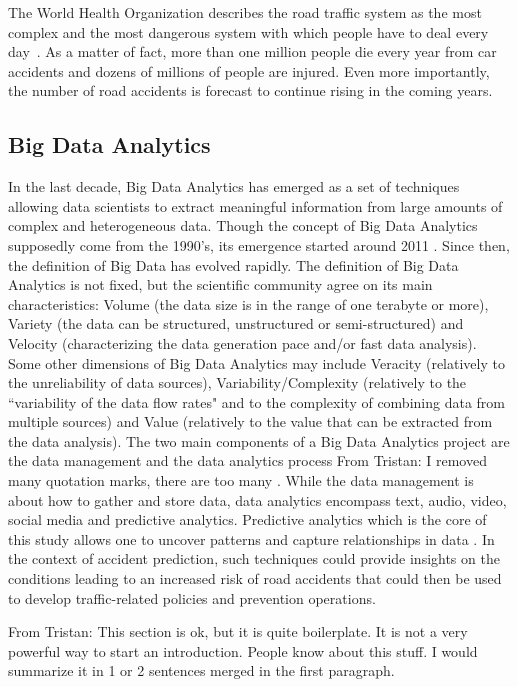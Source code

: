 \documentclass[conference]{IEEEtran}
\newcommand{\TG}[1]{\colorlet{saved}{.}\color{orange}From Tristan: #1\color{saved}}
\begin{document}
The World Health Organization describes the road traffic system as the most
complex and the most dangerous system with which people have to deal every
day~\cite{Peden2004}. As a matter of fact, more than one million people
die every year from car accidents and dozens of millions of people are
injured. Even more importantly, the number of road accidents is forecast to
continue rising in the coming years.

\subsection{Big Data Analytics}

In the last decade, Big Data Analytics has emerged as a set of techniques allowing data scientists to extract meaningful information from large amounts of complex and heterogeneous data. Though the concept of Big Data Analytics supposedly come from the 1990's, its emergence started around 2011 \cite{Gandomi2015}. Since then, the definition of Big Data has evolved rapidly. The definition of Big Data Analytics is not fixed, but the scientific community agree on its main characteristics: Volume (the data size is in the range of one terabyte or more), Variety (the data can be structured, unstructured or semi-structured) and Velocity (characterizing the data generation pace and/or fast data analysis). Some other dimensions of Big Data Analytics may include Veracity (relatively to the unreliability of data sources), Variability/Complexity (relatively to the ``variability of the data flow rates" and to the complexity of combining data from multiple sources) and Value (relatively to the value that can be extracted from the data analysis). The two main components of a Big Data Analytics project are the data management and the data analytics process \TG{I removed many quotation marks, there are too many} \cite{Gandomi2015}. While the data management is about how to gather and store data, data analytics encompass text, audio, video, social media and predictive analytics. Predictive analytics which is the core of this study allows one to uncover patterns and capture relationships in data \cite{Gandomi2015}. In the context of accident prediction, such techniques could provide insights on the conditions leading to an increased risk of road accidents that could then be used to develop traffic-related policies and prevention operations. 

\TG{This section is ok, but it is quite boilerplate. It is not a very powerful way to start
an introduction. People know about this stuff. I would summarize it in 1 or 2 sentences merged in the first paragraph.}
\end{document}
